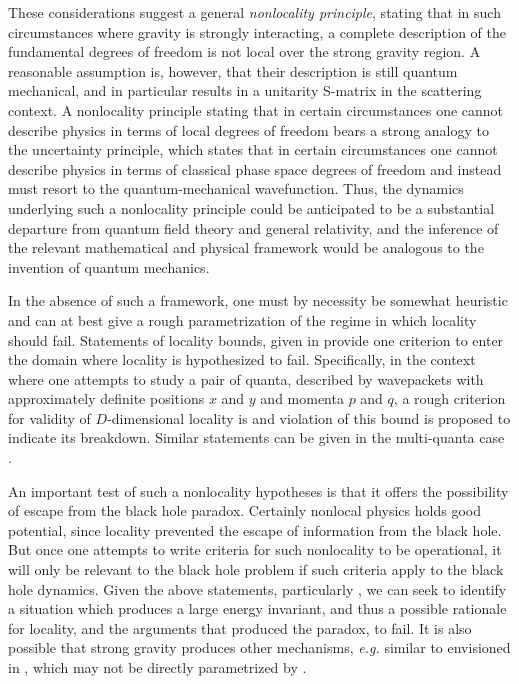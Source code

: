 These considerations suggest a general {\it nonlocality principle}, stating that in such circumstances where gravity is strongly interacting, a complete description of the fundamental degrees of freedom is not local over the strong gravity region.  A reasonable assumption is, however, that their description is still quantum mechanical, and in particular results in a unitarity S-matrix in the scattering context.  A nonlocality principle stating that in certain circumstances one cannot describe physics in terms of local degrees of freedom bears a strong analogy to the uncertainty principle, which states that in certain circumstances one cannot describe physics in terms of classical phase space degrees of freedom and instead must resort to the quantum-mechanical wavefunction.  Thus, the dynamics underlying such a nonlocality principle could be anticipated to be a substantial departure from quantum field theory and general relativity, and the inference of the relevant mathematical and physical framework would be analogous to the invention of quantum mechanics.

In the absence of such a framework, one must by necessity be somewhat heuristic and
can at best give a rough parametrization of the regime in which locality should fail.  Statements of locality bounds, given in  provide one criterion to enter the domain where locality is hypothesized to fail.  Specifically, in the context where one attempts to study a pair of quanta, described by wavepackets with approximately definite positions $x$ and $y$ and momenta $p$ and $q$, a rough criterion for validity of $D$-dimensional locality is
%
\eqn{}
%
and violation of this bound is proposed to indicate its breakdown.
Similar statements can be given in the multi-quanta case \SGloc.

An important test of such a nonlocality hypotheses is that it offers the possibility of escape from the black hole paradox.  Certainly nonlocal physics holds good potential, since locality prevented the escape of information from the black hole.  But once one attempts to write criteria for such nonlocality to be operational, it will only be relevant to the black hole problem if such criteria apply to the black hole dynamics.  Given the above statements, particularly \locbd, we can seek to identify a situation which produces a large energy invariant, and thus a possible rationale for locality, and the arguments that produced the paradox, to fail.  It is also possible that strong gravity produces other mechanisms, {\it e.g.} similar to envisioned in \BHMR, which may not be directly parametrized by \locbd.


